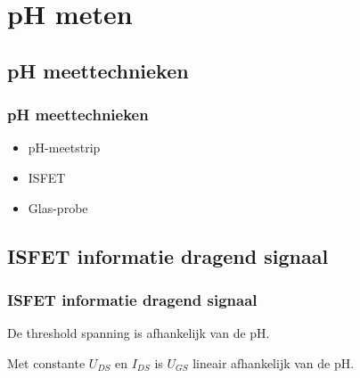 \section{pH meten}
    \subsection*{pH meettechnieken}
    \begin{frame}
        \frametitle{pH meettechnieken}
    
        \begin{itemize}
            \item pH-meetstrip
            \item ISFET
            \item Glas-probe
        \end{itemize}
        
    \end{frame}

    \subsection*{ISFET informatie dragend signaal}
    \begin{frame}
        \frametitle{ISFET informatie dragend signaal}

        De threshold spanning is afhankelijk van de pH.

        Met constante $U_{DS}$ en $I_{DS}$ is $U_{GS}$ lineair afhankelijk van de pH.
    
    
    \end{frame}